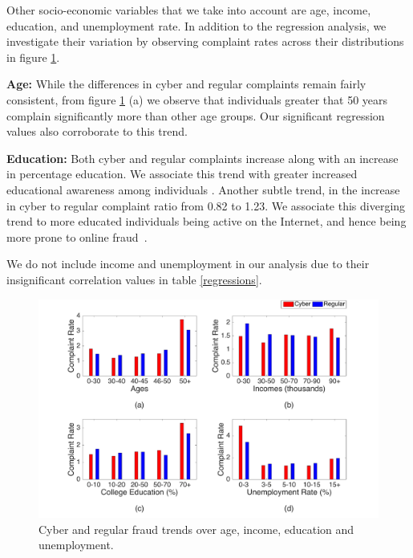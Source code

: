 \documentclass[conference]{IEEEtran}
\begin{document}
Other socio-economic variables that we take into account are age, income, education, and unemployment rate. In addition to the regression analysis, we investigate their variation by observing complaint rates across their distributions in figure \ref{demographics}.

\textbf{Age:} While the differences in cyber and regular complaints remain fairly consistent, from figure \ref{demographics} (a) we observe that individuals greater that 50 years complain significantly more than other age groups. Our significant regression values also corroborate to this trend. 


\textbf{Education:} Both cyber and regular complaints increase along with an increase in percentage education. We associate this trend with greater increased educational awareness among individuals \cite{consumerlessons}. Another subtle trend, in the increase in cyber to regular complaint ratio from 0.82 to 1.23. We associate this diverging trend to more educated individuals being active on the Internet, and hence being more prone to online fraud~\cite{pewcollege}.

We do not include income and unemployment in our analysis due to their insignificant correlation values in table \ref{regressions}.

\begin{figure}[t]
\centering
  \includegraphics[scale=0.29]{graphics/demographics.pdf}
  \caption{Cyber and regular fraud trends over age, income, education and unemployment.}
  \label{demographics}
\end{figure}
\end{document}
